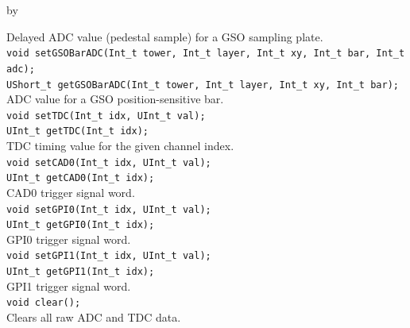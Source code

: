 \documentclass[twoside]{article}
\newcommand{\entrylabel}[1]{\mbox{\textbf{{#1}}}\hfil}%
\newenvironment{entry}
{\begin{list}{}%
    {\renewcommand{\makelabel}{\entrylabel}%
     \setlength{\labelwidth}{90pt}%
     \setlength{\leftmargin}{\labelwidth}
     \advance\leftmargin by \labelsep%
      }%
    }%
  {\end{list}}
\newcommand{\Entrylabel}[1]%
{\raisebox{0pt}[1ex][0pt]{\makebox[\labelwidth][l]%
    {\parbox[t]{\labelwidth}{\hspace{0pt}\textbf{{#1}}}}}}
\newenvironment{Entry}%
{\renewcommand{\entrylabel}{\Entrylabel}\begin{entry}}%
  {\end{entry}}
\begin{document}
\begin{Entry}
    Delayed ADC value (pedestal sample) for a GSO sampling plate.\\
    \verb+void setGSOBarADC(Int_t tower, Int_t layer, Int_t xy, Int_t bar, Int_t adc);+\\
    \verb+UShort_t getGSOBarADC(Int_t tower, Int_t layer, Int_t xy, Int_t bar);+\\
    ADC value for a GSO position-sensitive bar.\\
    \verb+void setTDC(Int_t idx, UInt_t val);+\\
    \verb+UInt_t getTDC(Int_t idx);+\\
    TDC timing value for the given channel index.\\
    \verb+void setCAD0(Int_t idx, UInt_t val);+\\
    \verb+UInt_t getCAD0(Int_t idx);+\\
    CAD0 trigger signal word.\\
    \verb+void setGPI0(Int_t idx, UInt_t val);+\\
    \verb+UInt_t getGPI0(Int_t idx);+\\
    GPI0 trigger signal word.\\
    \verb+void setGPI1(Int_t idx, UInt_t val);+\\
    \verb+UInt_t getGPI1(Int_t idx);+\\
    GPI1 trigger signal word.\\
    \verb+void clear();+\\
    Clears all raw ADC and TDC data.\\
\end{Entry}
\clearpage

\end{document}
